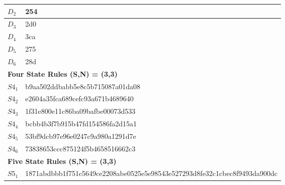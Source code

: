 \documentclass{elsarticle}
\begin{document}
\begin{multicols}{2}
\begin{table}[!htb]
\begin{tabular}{|p{2cm}|l|}
$D_{2}$ &   254 \\ \hline
$D_{3}$ &   2d0 \\ \hline
$D_{4}$ &   3ca \\ \hline
$D_{5}$ &   275 \\ \hline
$D_{6}$ &   28d \\ \hline
\multicolumn{2}{|l|}{\textbf{Four State Rules (S,N) = (3,3)}} \\ \hline
$S4_{1}$ &   b9aa502ddbabb5e8c5b715087a01da08\\ \hline
$S4_{2}$ &   e2604a35fca689cefc93a671b4689640 \\ \hline
$S4_{3}$ &   1f31e800e11c86ba09bafbe00073d533\\ \hline
$S4_{4}$ &   bcbb4b3f7b915b47fd154586fa2d15a1\\ \hline
$S4_{5}$ &   53bf9dcb97e96e0247c9a980a1291d7e \\ \hline
$S4_{6}$ &   73838653ccc875124f5b4658516662c3\\
\hline
\multicolumn{2}{|l|}{\textbf{Five State Rules (S,N) = (3,3)}} \\ \hline
 $S5_{1}$ & %
    1871abdbbb1f751c5649ce2208abe0525e5e98543e527293d8fe32c1cbec8f9493da900dc 

\end{tabular}
\end{table}
\end{multicols}
\end{document}

